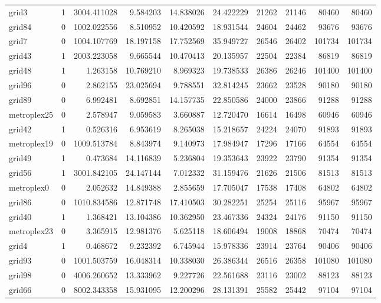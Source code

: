 \begin{longtable}{|l|r|r|r|r|r|r|r|r|r|}
grid3 & 1 & 3004.411028 & 9.584203 & 14.838026 & 24.422229 & 21262 & 21146 & 80460 & 80460 \\
grid84 & 0 & 1002.022556 & 8.510952 & 10.420592 & 18.931544 & 24604 & 24462 & 93676 & 93676 \\
grid7 & 0 & 1004.107769 & 18.197158 & 17.752569 & 35.949727 & 26546 & 26402 & 101734 & 101734 \\
grid43 & 1 & 2003.223058 & 9.665544 & 10.470413 & 20.135957 & 22504 & 22384 & 86819 & 86819 \\
grid48 & 1 & 1.263158 & 10.769210 & 8.969323 & 19.738533 & 26386 & 26246 & 101400 & 101400 \\
grid96 & 0 & 2.862155 & 23.025694 & 9.788551 & 32.814245 & 23662 & 23528 & 90180 & 90180 \\
grid89 & 0 & 6.992481 & 8.692851 & 14.157735 & 22.850586 & 24000 & 23866 & 91288 & 91288 \\
metroplex25 & 0 & 2.578947 & 9.059583 & 3.660887 & 12.720470 & 16614 & 16498 & 60946 & 60946 \\
grid42 & 1 & 0.526316 & 6.953619 & 8.265038 & 15.218657 & 24224 & 24070 & 91893 & 91893 \\
metroplex19 & 0 & 1009.513784 & 8.843974 & 9.140973 & 17.984947 & 17296 & 17166 & 64554 & 64554 \\
grid49 & 1 & 0.473684 & 14.116839 & 5.236804 & 19.353643 & 23922 & 23790 & 91354 & 91354 \\
grid56 & 1 & 3001.842105 & 24.147144 & 7.012332 & 31.159476 & 21626 & 21506 & 81513 & 81513 \\
metroplex0 & 0 & 2.052632 & 14.849388 & 2.855659 & 17.705047 & 17538 & 17408 & 64802 & 64802 \\
grid86 & 0 & 1010.834586 & 12.871748 & 17.410503 & 30.282251 & 25254 & 25116 & 95967 & 95967 \\
grid40 & 1 & 1.368421 & 13.104386 & 10.362950 & 23.467336 & 24324 & 24176 & 91150 & 91150 \\
metroplex23 & 0 & 3.365915 & 12.981376 & 5.625118 & 18.606494 & 19008 & 18868 & 70474 & 70474 \\
grid4 & 1 & 0.468672 & 9.232392 & 6.745944 & 15.978336 & 23914 & 23764 & 90406 & 90406 \\
grid93 & 0 & 1001.503759 & 16.048314 & 10.338030 & 26.386344 & 26516 & 26358 & 101080 & 101080 \\
grid98 & 0 & 4006.260652 & 13.333962 & 9.227726 & 22.561688 & 23116 & 23002 & 88123 & 88123 \\
grid66 & 0 & 8002.343358 & 15.931095 & 12.200296 & 28.131391 & 25582 & 25442 & 97104 & 97104 \\

\end{longtable}
